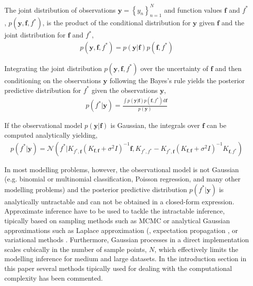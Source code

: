 \documentclass[]{interact}
\theoremstyle{plain}%
\theoremstyle{definition}
\theoremstyle{remark}
\begin{document}
The joint distribution of observations $\mathbf{y} = \left\lbrace y_n \right\rbrace_{n=1}^N$ and function values $\mathbf{f}$ and $f^*$, $p(\mathbf{y}, \mathbf{f}, f^*)$, is the product of the conditional distribution for $\mathbf{y}$ given $\mathbf{f}$ and the joint distribution for $\mathbf{f}$ and $f^*$,
\begin{align*}
	p(\mathbf{y}, \mathbf{f}, f^*) = p(\mathbf{y}|\mathbf{f})p(\mathbf{f}, f^*)
\end{align*}

Integrating the joint distribution  $p(\mathbf{y}, \mathbf{f}, f^*)$ over the uncertainty of $\mathbf{f}$ and then conditioning on the observations $\mathbf{y}$ following the Bayes's rule yields the posterior predictive distribution for $f^*$ given the observations $\mathbf{y}$,
%
\begin{align*}
	p(f^*|\mathbf{y}) = \frac{\int p(\mathbf{y}|\mathbf{f})p(\mathbf{f}, f^*)\text{d}\mathbf{f}}{p(\mathbf{y})}
\end{align*}

If the observational model $p(\mathbf{y}|\mathbf{f})$ is Gaussian, the integrals over $\mathbf{f}$ can be computed analytically yielding,
\begin{align*}
	p(f^*| \mathbf{y}) = \mathcal{N}(f^*| K_{f^*,\mathbf{f}} (K_{\mathbf{f},\mathbf{f}} + \sigma^2I)^{-1} \mathbf{f},  K_{f^*,f^*}-K_{f^*,\mathbf{f}} (K_{\mathbf{f},\mathbf{f}} + \sigma^2I)^{-1} K_{\mathbf{f},f^*}  )
\end{align*}

In most modelling problems, however, the observational model is not Gaussian (e.g. binomial or multinomial classification, Poisson  regression, and many other modelling problems) and the posterior predictive distribution $p(f^*| \mathbf{y})$ is analytically untractable and can not be obtained in a closed-form expression. Approximate inference have to be used to tackle the intractable inference, tipically based on sampling methods such as MCMC \citep{brooks_2011} or analytical Gaussian approximations such as Laplace approximation (\citep{williams1998bayesian,rasmussen2006gaussian}, expectation propagation \citep{minka2001expectation}, or variational methods \citep{gibbs2000variational,csato2000efficient}. Furthermore, Gaussian processes in a direct implementation scales cubically in the number of sample points, $N$, which effectively limits the modelling inference for medium and large datasets. In the introduction section in this paper several methods tipically used for dealing with the computational complexity has been commented. \\
\end{document}
